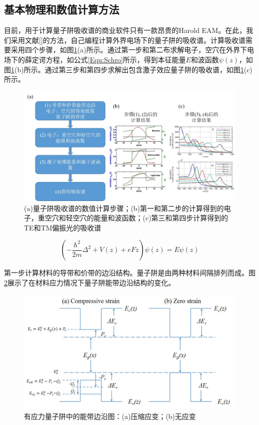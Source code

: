 \subsection{基本物理和数值计算方法}
目前，用于计算量子阱吸收谱的商业软件只有一款昂贵的Harold EAM\cite{HarolEAM}。在此，我们采用文献[]的方法，自己编程计算外界电场下的量子阱的吸收谱。计算吸收谱需要采用四个步骤，如图\ref{fig_ch2_flow_chart}(a)所示。通过第一步和第二布求解电子，空穴在外界下电场下的薛定谔方程，如公式\ref{Equ:Schro}所示，得到本征能量$E$和波函数$\psi(z)$，如图\ref{fig_ch2_flow_chart}(b)所示。通过第三步和第四步求解出包含激子效应量子阱的吸收谱，如图\ref{fig_ch2_flow_chart}(c)所示。
\begin{figure}[htb]
	\centering
	\includegraphics[width=16cm]{./Pictures/fig_ch2_flow_chart.jpg}
	\caption{(a)量子阱吸收谱的数值计算步骤；(b)第一和第二步的计算得到的电子，重空穴和轻空穴的能量和波函数；(c)第三和第四步计算得到的TE和TM偏振光的吸收谱}
	\label{fig_ch2_flow_chart}
\end{figure}

\begin{equation}
\label{Equ:Schro}
(-\frac{\hbar^2}{2m}\Delta^2+V(z)+eFz)\psi(z)=E\psi(z)
\end{equation}

第一步计算材料的导带和价带的边沿结构。量子阱是由两种材料间隔排列而成。图\ref{fig_ch2_band_diagram}展示了在材料应力情况下量子阱能带边沿结构的变化\cite{chuang1995physics}。

\begin{figure}[htb]
	\centering
	\includegraphics[width=14cm]{./Pictures/fig_ch2_band_diagram.jpg}
	\caption{有应力量子阱中的能带边沿图：(a)压缩应变；(b)无应变}
	\label{fig_ch2_band_diagram}
\end{figure}

